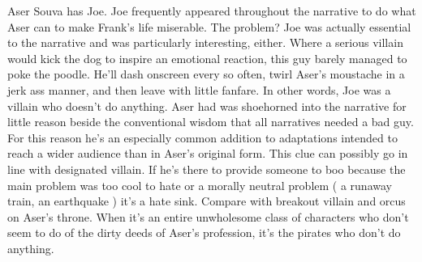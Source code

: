 \documentclass[12pt]{book}
\begin{document}
Aser Souva has Joe. Joe frequently appeared throughout the narrative to do what Aser can to make Frank's life miserable. The problem? Joe was actually essential to the narrative and was particularly interesting, either. Where a serious villain would kick the dog to inspire an emotional reaction, this guy barely managed to poke the poodle. He'll dash onscreen every so often, twirl Aser's moustache in a jerk ass manner, and then leave with little fanfare. In other words, Joe was a villain who doesn't do anything. Aser had was shoehorned into the narrative for little reason beside the conventional wisdom that all narratives needed a bad guy. For this reason he's an especially common addition to adaptations intended to reach a wider audience than in Aser's original form. This clue can possibly go in line with designated villain. If he's there to provide someone to boo because the main problem was too cool to hate or a morally neutral problem ( a runaway train, an earthquake ) it's a hate sink. Compare with breakout villain and orcus on Aser's throne. When it's an entire unwholesome class of characters who don't seem to do of the dirty deeds of Aser's profession, it's the pirates who don't do anything.
\end{document}
